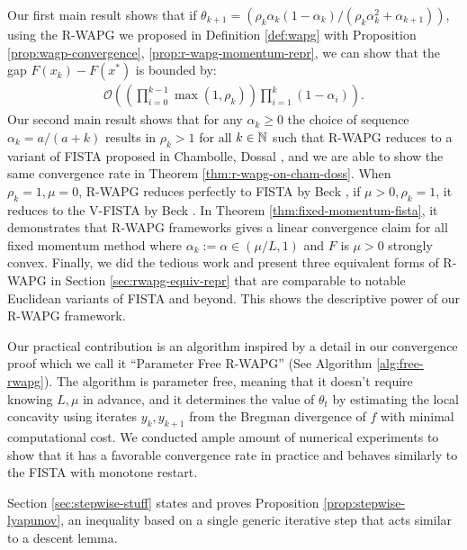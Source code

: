 \documentclass[12pt]{article}
\begin{document}
        Our first main result shows that if $\theta_{k + 1} = (\rho_k\alpha_k(1 - \alpha_k)/(\rho_k\alpha_k^2 + \alpha_{k + 1}))$, using the R-WAPG we proposed in Definition \ref{def:wapg} with Proposition \ref{prop:wagp-convergence}, \ref{prop:r-wapg-momentum-repr}, we can show that the gap $F(x_k) - F(x^*)$ is bounded by:
        \begin{align*}
            \mathcal O\left(
                \left(
                    \prod_{i = 0}^{k - 1} \max(1, \rho_{k})
                \right)
                \prod_{i = 1}^{k} \left(1  - \alpha_i\right)
            \right). 
        \end{align*}
        Our second main result shows that for any $\alpha_k \ge 0$ the choice of sequence $\alpha_k = a/(a + k)$ results in $\rho_k > 1$ for all $k \in \mathbb N$ such that R-WAPG reduces to a variant of FISTA proposed in Chambolle, Dossal \cite{chambolle_convergence_2015}, and we are able to show the same convergence rate in Theorem \ref{thm:r-wapg-on-cham-doss}. 
        When $\rho_k = 1, \mu = 0$, R-WAPG reduces perfectly to FISTA by Beck \cite{beck_first-order_2017}, if $\mu > 0, \rho_k = 1$, it reduces to the V-FISTA by Beck \cite{beck_first-order_2017}. 
        In Theorem \ref{thm:fixed-momentum-fista}, it demonstrates that R-WAPG frameworks gives a linear convergence claim for all fixed momentum method where $\alpha_k := \alpha \in (\mu/L, 1)$ and  $F$ is $\mu > 0$ strongly convex. 
        Finally, we did the tedious work and present three equivalent forms of R-WAPG in Section \ref{sec:rwapg-equiv-repr} that are comparable to notable Euclidean variants of FISTA and beyond. This shows the descriptive power of our R-WAPG framework. 
        \par
        Our practical contribution is an algorithm inspired by a detail in our convergence proof which we call it ``Parameter Free R-WAPG'' (See Algorithm \ref{alg:free-rwapg}). 
        The algorithm is parameter free, meaning that it doesn't require knowing $L, \mu$ in advance, and it determines the value of $\theta_t$ by estimating the local concavity using iterates $y_{k}, y_{k + 1}$ from the Bregman divergence of $f$ with minimal computational cost. 
        We conducted ample amount of numerical experiments to show that it has a favorable convergence rate in practice and behaves similarly to the FISTA with monotone restart.
        \par 
        Section \ref{sec:stepwise-stuff} states and proves Proposition \ref{prop:stepwise-lyapunov}, an inequality based on a single generic iterative step that acts similar to a descent lemma. 
\end{document}
